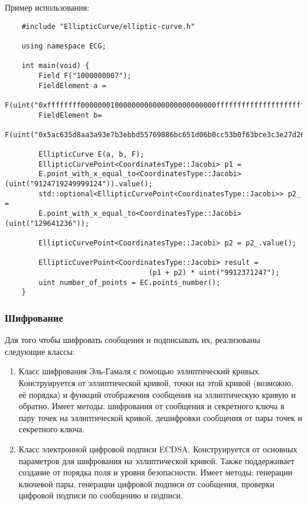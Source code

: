 \documentclass{article}
\begin{document}
  Пример использования:
  \begin{frame}

\begin{lstlisting}
    #include "EllipticCurve/elliptic-curve.h"

    using namespace ECG; 

    int main(void) {
        Field F("1000000007");
        FieldElement a = 
        F(uint("0xffffffff00000001000000000000000000000000fffffffffffffffffffffffc"));
        FieldElement b=
        F(uint("0x5ac635d8aa3a93e7b3ebbd55769886bc651d06b0cc53b0f63bce3c3e27d2604b"));

        EllipticCurve E(a, b, F);
        EllipticCurvePoint<CoordinatesType::Jacobi> p1 = 
        E.point_with_x_equal_to<CoordinatesType::Jacobi>(uint("9124719249999124")).value();
        std::optional<EllipticCurvePoint<CoordinatesType::Jacobi>> p2_ = 
        E.point_with_x_equal_to<CoordinatesType::Jacobi>(uint("129641236"));

        EllipticCurvePoint<CoordinatesType::Jacobi> p2 = p2_.value();

        EllipticCuverPoint<CoordinatesType::Jacobi> result =
                                  (p1 + p2) * uint("9912371247");
        uint number_of_points = EC.points_number();
    }
\end{lstlisting}
\end{frame}
\subsubsection{Шифрование}
  Для того чтобы шифровать сообщения и подписывать их, реализованы следующие классы:
\begin{enumerate}
  \item Класс шифрования Эль-Гамаля с помощью эллиптический кривых. Конструируется от эллиптической кривой, точки на этой кривой (возможно, её порядка) и функций отображения сообщения на эллиптическую кривую и обратно. Имеет методы: шифрования от сообщения и секретного ключа в пару точек на эллиптической кривой, дешифровки сообщения от пары точек и секретного ключа.
  \item Класс электронной цифровой подписи ECDSA. Конструируется от основных параметров для шифрования на эллиптической кривой. Также поддерживает создание от порядка поля и уровня безопасности. Имеет методы: генерации ключевой пары, генерации цифровой подписи от сообщения, проверки цифровой подписи по  сообщению и подписи.
\end{enumerate}
\end{document}
